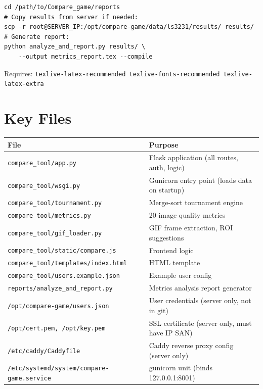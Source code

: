 \documentclass[11pt]{article}
\begin{document}
\begin{lstlisting}
cd /path/to/Compare_game/reports
# Copy results from server if needed:
scp -r root@SERVER_IP:/opt/compare-game/data/ls3231/results/ results/
# Generate report:
python analyze_and_report.py results/ \
    --output metrics_report.tex --compile
\end{lstlisting}

Requires: \texttt{texlive-latex-recommended texlive-fonts-recommended texlive-latex-extra}

\section{Key Files}

\begin{tabular}{ll}
\textbf{File} & \textbf{Purpose} \\
\hline
\texttt{compare\_tool/app.py} & Flask application (all routes, auth, logic) \\
\texttt{compare\_tool/wsgi.py} & Gunicorn entry point (loads data on startup) \\
\texttt{compare\_tool/tournament.py} & Merge-sort tournament engine \\
\texttt{compare\_tool/metrics.py} & 20 image quality metrics \\
\texttt{compare\_tool/gif\_loader.py} & GIF frame extraction, ROI suggestions \\
\texttt{compare\_tool/static/compare.js} & Frontend logic \\
\texttt{compare\_tool/templates/index.html} & HTML template \\
\texttt{compare\_tool/users.example.json} & Example user config \\
\texttt{reports/analyze\_and\_report.py} & Metrics analysis report generator \\
\texttt{/opt/compare-game/users.json} & User credentials (server only, not in git) \\
\texttt{/opt/cert.pem, /opt/key.pem} & SSL certificate (server only, must have IP SAN) \\
\texttt{/etc/caddy/Caddyfile} & Caddy reverse proxy config (server only) \\
\texttt{/etc/systemd/system/compare-game.service} & gunicorn unit (binds 127.0.0.1:8001) \\
\end{tabular}
\end{document}
